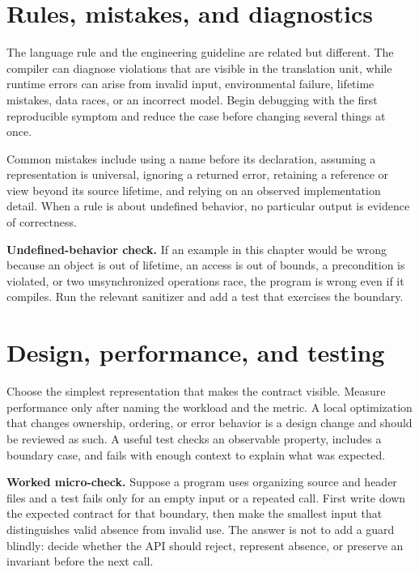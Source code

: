 \section{Rules, mistakes, and diagnostics}
The language rule and the engineering guideline are related but different. The compiler can diagnose violations that are visible in the translation unit, while runtime errors can arise from invalid input, environmental failure, lifetime mistakes, data races, or an incorrect model. Begin debugging with the first reproducible symptom and reduce the case before changing several things at once.

Common mistakes include using a name before its declaration, assuming a representation is universal, ignoring a returned error, retaining a reference or view beyond its source lifetime, and relying on an observed implementation detail. When a rule is about undefined behavior, no particular output is evidence of correctness.

\begin{warning}
\textbf{Undefined-behavior check.} If an example in this chapter would be wrong because an object is out of lifetime, an access is out of bounds, a precondition is violated, or two unsynchronized operations race, the program is wrong even if it compiles. Run the relevant sanitizer and add a test that exercises the boundary.
\end{warning}

\section{Design, performance, and testing}
Choose the simplest representation that makes the contract visible. Measure performance only after naming the workload and the metric. A local optimization that changes ownership, ordering, or error behavior is a design change and should be reviewed as such. A useful test checks an observable property, includes a boundary case, and fails with enough context to explain what was expected.

\begin{worked}
\textbf{Worked micro-check.} Suppose a program uses organizing source and header files and a test fails only for an empty input or a repeated call. First write down the expected contract for that boundary, then make the smallest input that distinguishes valid absence from invalid use. The answer is not to add a guard blindly: decide whether the API should reject, represent absence, or preserve an invariant before the next call.
\end{worked}

